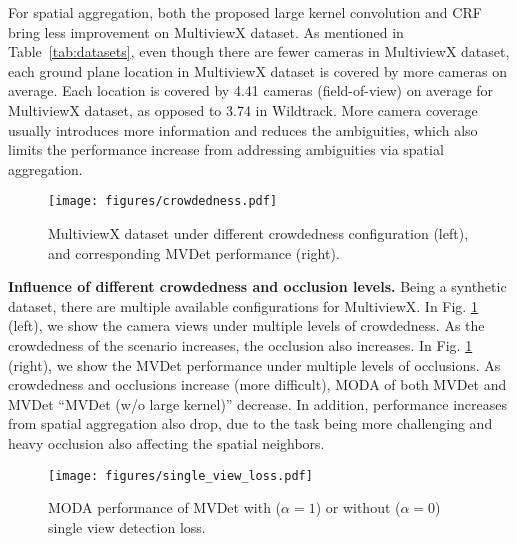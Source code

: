 \documentclass[runningheads]{llncs}
\begin{document}
For spatial aggregation, both the proposed large kernel convolution and CRF bring less improvement on MultiviewX dataset. 
As mentioned in Table~\ref{tab:datasets}, even though there are fewer cameras in MultiviewX dataset, 
each ground plane location in MultiviewX dataset is covered by more cameras on average. Each location is covered by 4.41 cameras (field-of-view) on average for MultiviewX dataset, as opposed to 3.74 in Wildtrack. More camera coverage usually introduces more information and reduces the ambiguities, which also limits the performance increase from addressing ambiguities via spatial aggregation. 




\begin{figure}[t]
    \texttt{[image: figures/crowdedness.pdf]}
    \caption{MultiviewX dataset under different crowdedness configuration (left), and corresponding MVDet performance (right). 
    }
    \label{fig:crowdedness}
\end{figure}

\textbf{Influence of different crowdedness and occlusion levels. }
Being a synthetic dataset, there are multiple available configurations for MultiviewX. In Fig. \ref{fig:crowdedness} (left), we show the camera views under multiple levels of crowdedness. As the crowdedness of the scenario increases, the occlusion also increases. In Fig. \ref{fig:crowdedness} (right), we show the MVDet performance under multiple levels of occlusions. As crowdedness and occlusions increase (more difficult), MODA of both MVDet and MVDet ``MVDet (w/o large kernel)'' decrease. In addition, performance increases from spatial aggregation also drop, due to the task being more challenging and heavy occlusion also affecting the spatial neighbors. 


\begin{wrapfigure}{l}{0.4\textwidth}
    \centering
    \texttt{[image: figures/single\_view\_loss.pdf]}
    \caption{MODA performance of MVDet with ($\alpha=1$) or without ($\alpha=0$) single view detection loss. 
    }
    \label{fig:single_view_loss}
\end{wrapfigure}
\end{document}
